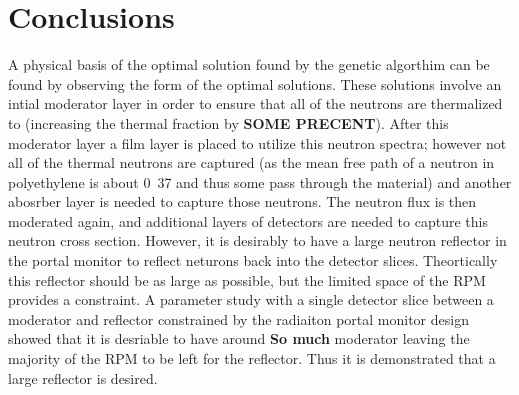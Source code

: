 \section{Conclusions}

A physical basis of the optimal solution found by the genetic algorthim can be found by observing the form of the optimal solutions.
These solutions involve an intial moderator layer in order to ensure that all of the neutrons are thermalized to (increasing the thermal fraction by \textbf{SOME PRECENT}).
After this moderator layer a film layer is placed to utilize this neutron spectra; however not all of the thermal neutrons are captured (as the mean free path of a neutron in polyethylene is about \si{0.37}{\cm} and thus some pass through the material) and another abosrber layer is needed to capture those neutrons.  
The neutron flux is then moderated again, and additional layers of detectors are needed to capture this neutron cross section.
However, it is desirably to have a large neutron reflector in the portal monitor to reflect neturons back into the detector slices. 
Theortically this reflector should be as large as possible, but the limited space of the RPM provides a constraint.
A parameter study with a single detector slice between a moderator and reflector constrained by the radiaiton portal monitor design showed that it is desriable to have around \textbf{So much} moderator leaving the majority of the RPM to be left for the reflector.
Thus it is demonstrated that a large reflector is desired.
